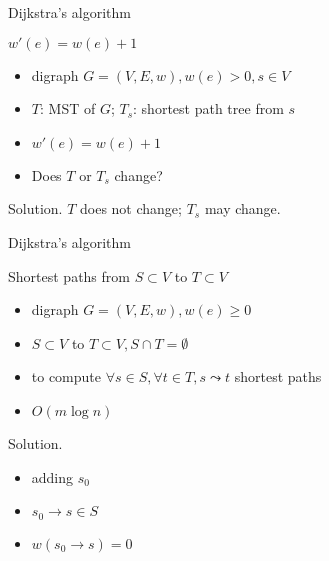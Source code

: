 \begin{frame}{Dijkstra's algorithm}
  \begin{exampleblock}{$w'(e) = w(e) + 1$ }
    \begin{itemize}
      \item digraph $G = (V, E, w), w(e) > 0, s \in V$
      \item $T$: MST of $G$; $T_{s}$: shortest path tree from $s$
      \item $w'(e) = w(e) + 1$
      \item Does $T$ or $T_{s}$ change?
    \end{itemize}
  \end{exampleblock}

  \begin{block}{Solution.}
    $T$ does not change; $T_{s}$ may change.
  \end{block}
\end{frame}
\begin{frame}{Dijkstra's algorithm}
  \begin{exampleblock}{Shortest paths from $S \subset V$ to $T \subset V$}
    \begin{itemize}
      \item digraph $G = (V, E, w), w(e) \ge 0$
      \item $S \subset V$ to $T \subset V, S \cap T = \emptyset$
      \item to compute $\forall s \in S, \forall t \in T, s \leadsto t$ shortest paths
      \item $O(m \log n)$
    \end{itemize}
  \end{exampleblock}

  \begin{block}{Solution.}
    \begin{itemize}
      \item adding $s_{0}$
      \item $s_{0} \to s \in S$
      \item $w(s_{0} \to s) = 0$
    \end{itemize}
  \end{block}
\end{frame}
